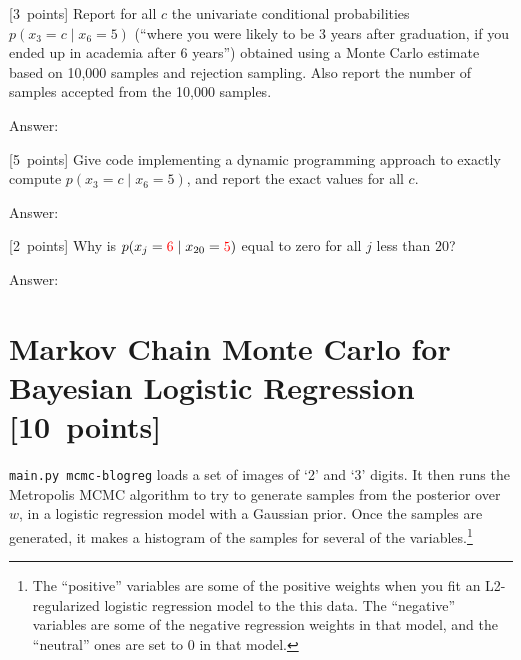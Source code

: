 \documentclass{article}
\newcommand{\ask}[1]{\textcolor{question}{#1}}
\newenvironment{answer}{\par\begingroup\color{answer}Answer: }{\endgroup}
\newcommand{\red}[1]{\textcolor{red}{#1}}
\newcommand{\pts}[1]{\textcolor{points}{[#1~points]}}
\newcommand{\TODO}{\color{red}{TODO}}
\begin{document}
\begin{qlist}
\item \pts{3}
    \ask{Report for all $c$ the univariate conditional probabilities $p(x_3 = c \mid  x_{6} = 5)$ (``where you were likely to be 3 years after graduation, if you ended up in academia after 6 years'') obtained using a Monte Carlo estimate based on 10,000 samples and rejection sampling. Also report the number of samples accepted from the 10,000 samples.}
\begin{answer}\TODO\end{answer}

\item \pts{5}
    \ask{Give code implementing a dynamic programming approach to exactly compute $p(x_3 = c \mid  x_{6} = 5)$, and report the exact values for all $c$.}
\begin{answer}\TODO\end{answer}

\item \pts{2} \ask{Why is $p(x_j = \red{6} \mid x_{20} = \red{5})$ equal to zero for all $j$ less than $20$?}
\begin{answer}\TODO\end{answer}

\end{qlist}


\clearpage
\section{Markov Chain Monte Carlo for Bayesian Logistic Regression \pts{10}}


\texttt{main.py mcmc-blogreg} loads a set of images of `2' and `3' digits.
It then runs the Metropolis MCMC algorithm to try to generate samples from the posterior over $w$, in a logistic regression model with a Gaussian prior.
Once the samples are generated, it makes a histogram of the samples for several of the variables.\footnote{The ``positive'' variables are some of the positive weights  when you fit an L2-regularized logistic regression model to the this data. The ``negative'' variables are some of the negative regression weights in that model, and the ``neutral'' ones are set to 0 in that model.}
\end{document}
